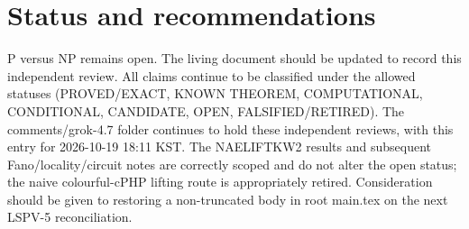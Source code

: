 \documentclass[11pt]{article}
\begin{document}
\section{Status and recommendations}
P versus NP remains open. The living document should be updated to record this independent review. All claims continue to be classified under the allowed statuses (PROVED/EXACT, KNOWN THEOREM, COMPUTATIONAL, CONDITIONAL, CANDIDATE, OPEN, FALSIFIED/RETIRED). The comments/grok-4.7 folder continues to hold these independent reviews, with this entry for 2026-10-19 18:11 KST. The NAELIFTKW2 results and subsequent Fano/locality/circuit notes are correctly scoped and do not alter the open status; the naive colourful-cPHP lifting route is appropriately retired. Consideration should be given to restoring a non-truncated body in root main.tex on the next LSPV-5 reconciliation.

\end{document}
